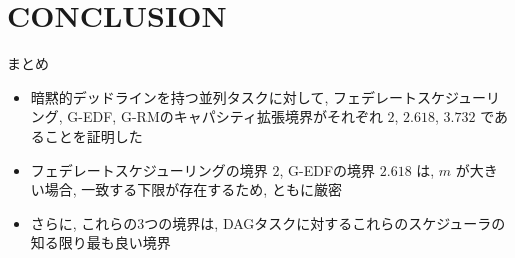 
\section{CONCLUSION}
\label{sec: conclusion}

\begin{frame}{まとめ}
    \begin{itemize}
        \item 暗黙的デッドラインを持つ並列タスクに対して, フェデレートスケジューリング, G-EDF, G-RMのキャパシティ拡張境界がそれぞれ $2$, $2.618$, $3.732$ であることを証明した
        \item フェデレートスケジューリングの境界 $2$, G-EDFの境界 $2.618$ は, $m$ が大きい場合, 一致する下限が存在するため, ともに厳密
        \item さらに, これらの3つの境界は, DAGタスクに対するこれらのスケジューラの知る限り最も良い境界
    \end{itemize}
\end{frame}

